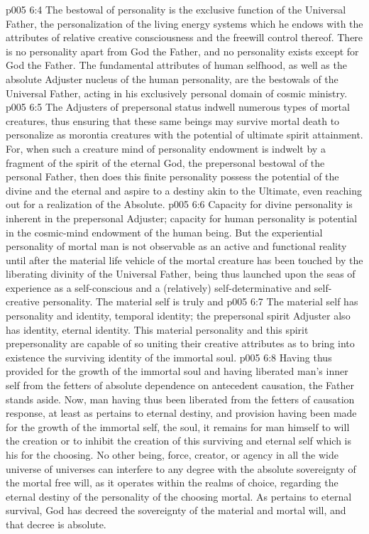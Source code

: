 \vs p005 6:4 The bestowal of personality is the exclusive function of the Universal Father, the personalization of the living energy systems which he endows with the attributes of relative creative consciousness and the freewill control thereof. There is no personality apart from God the Father, and no personality exists except for God the Father. The fundamental attributes of human selfhood, as well as the absolute Adjuster nucleus of the human personality, are the bestowals of the Universal Father, acting in his exclusively personal domain of cosmic ministry.
\vs p005 6:5 \pc The Adjusters of prepersonal status indwell numerous types of mortal creatures, thus ensuring that these same beings may survive mortal death to personalize as morontia creatures with the potential of ultimate spirit attainment. For, when such a creature mind of personality endowment is indwelt by a fragment of the spirit of the eternal God, the prepersonal bestowal of the personal Father, then does this finite personality possess the potential of the divine and the eternal and aspire to a destiny akin to the Ultimate, even reaching out for a realization of the Absolute.
\vs p005 6:6 Capacity for divine personality is inherent in the prepersonal Adjuster; capacity for human personality is potential in the cosmic\hyp{}mind endowment of the human being. But the experiential personality of mortal man is not observable as an active and functional reality until after the material life vehicle of the mortal creature has been touched by the liberating divinity of the Universal Father, being thus launched upon the seas of experience as a self\hyp{}conscious and a (relatively) self\hyp{}determinative and self\hyp{}creative personality. The material self is truly and 
\vs p005 6:7 \pc The material self has personality and identity, temporal identity; the prepersonal spirit Adjuster also has identity, eternal identity. This material personality and this spirit prepersonality are capable of so uniting their creative attributes as to bring into existence the surviving identity of the immortal soul.
\vs p005 6:8 Having thus provided for the growth of the immortal soul and having liberated man’s inner self from the fetters of absolute dependence on antecedent causation, the Father stands aside. Now, man having thus been liberated from the fetters of causation response, at least as pertains to eternal destiny, and provision having been made for the growth of the immortal self, the soul, it remains for man himself to will the creation or to inhibit the creation of this surviving and eternal self which is his for the choosing. No other being, force, creator, or agency in all the wide universe of universes can interfere to any degree with the absolute sovereignty of the mortal free will, as it operates within the realms of choice, regarding the eternal destiny of the personality of the choosing mortal. As pertains to eternal survival, God has decreed the sovereignty of the material and mortal will, and that decree is absolute.
